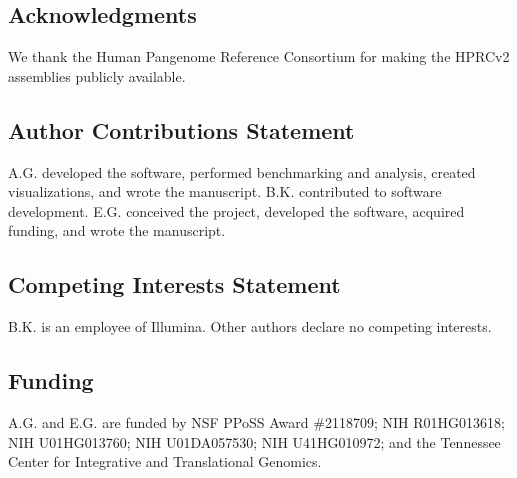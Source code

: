 
\subsection*{Acknowledgments}

We thank the Human Pangenome Reference Consortium for making the HPRCv2 assemblies publicly available.

\subsection*{Author Contributions Statement}

A.G. developed the software, performed benchmarking and analysis, created visualizations, and wrote the manuscript. B.K. contributed to software development. E.G. conceived the project, developed the software, acquired funding, and wrote the manuscript.

\subsection*{Competing Interests Statement}

B.K. is an employee of Illumina. Other authors declare no competing interests.

\subsection*{Funding}

A.G. and E.G. are funded by NSF PPoSS Award \#2118709; NIH R01HG013618; NIH U01HG013760; NIH U01DA057530; NIH U41HG010972; and the Tennessee Center for Integrative and Translational Genomics.
